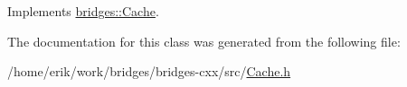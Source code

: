 Implements \hyperlink{classbridges_1_1_cache_ae74225542568a377fdcaf0354e466954}{bridges\+::\+Cache}.



The documentation for this class was generated from the following file\+:\begin{DoxyCompactItemize}
\item 
/home/erik/work/bridges/bridges-\/cxx/src/\hyperlink{_cache_8h}{Cache.\+h}\end{DoxyCompactItemize}
